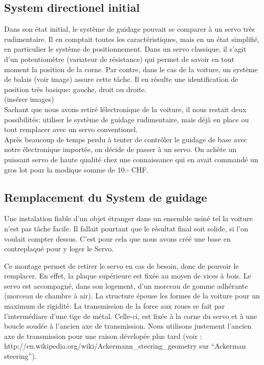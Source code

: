 \documentclass[a4paper,12pt]{article}
\begin{document}
{\subsection{System directionel initial}
Dans son \'etat initial, le syst\`eme de guidage pouvait se comparer \`a un
servo tr\`es rudimentaire. Il en comptait toutes les caractéristiques, mais en
un état simplifié, en particulier le système de positionnement. Dans un servo
classique, il s'agit d'un potentiomètre (variateur de résistance) qui permet
de savoir en tout moment la position de la corne. Par contre, dans le cas de
la voiture, un système de balais (voir image) assure cette tâche. Il en
résulte une identification de position très basique: gauche, droit ou
droite.\\
(ins\'erer images)\\
Sachant que nous avons retir\'e l\'electronique de la voiture, il nous restait
deux possibilit\'es: utiliser le syst\`eme de guidage rudimentaire, mais
d\'ej\`a en place ou tout remplacer avec un servo conventionel.\\
Apr\`es beaucoup de temps perdu \`a tenter de contr\^oler le guidage de base
avec notre \'electronique import\'ee, on d\'ecide de passer \`a un servo. On
ach\`ete un puissant servo de haute qualit\'e chez une connaissance qui en
avait command\'e un gros lot pour la modique somme de 10.- CHF.

\subsection{Remplacement du System de guidage}
Une instalation fiable d'un objet \'etranger dans un ensemble usin\'e tel la
voiture n'est pas t\^ache facile. Il fallait pourtant que le r\'esultat final
soit solide, si l'on voulait compter dessus. C'est pour cela que nous avons
cr\'e\'e une base en contreplaqu\'e pour y loger le Servo.

Ce montage permet de retirer le servo en cas de besoin, donc de pouvoir le
remplacer. En effet, la plaque sup\'erieure est fix\'ee au moyen de vices \`a
bois. Le servo est accompagn\'e, dans son logement, d'un morceau de gomme
adh\'erante (morceau de chambre \`a air). La structure \'epouse les formes de
la voiture pour un maximum de rigidit\'e. La transmission de la force aux
roues se fait par l'interm\'ediare d'une tige de m\'etal. Celle-ci, est
fix\'ee \`a la corne du servo et \`a une boucle soud\'ee \`a l'ancien axe de
transmission. Nous utilisons justement l'ancien axe de transmission pour une
raison d\'evelop\'ee plus tard (voir :
http://en.wikipedia.org/wiki/Ackermann\_steering\_geometry sur
``Ackerman steering'').

}
\end{document}
